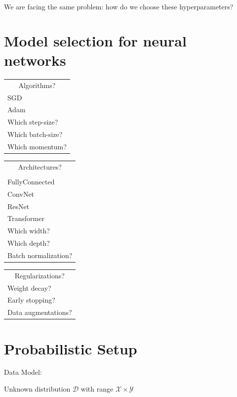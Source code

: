 \documentclass[10pt]{article}
\begin{document}
We are facing the same problem: how do we choose these hyperparameters?

\section*{Model selection for neural networks}
\begin{center}
\begin{tabular}{|l|}
\hline
\multicolumn{1}{|c|}{Algorithms?} \\
SGD \\
Adam \\
Which step-size? \\
Which batch-size? \\
Which momentum? \\
\hline
\end{tabular}
\end{center}

\begin{center}
\begin{tabular}{|l|}
\hline
\multicolumn{1}{|c|}{Architectures?} \\
 \\
FullyConnected \\
ConvNet \\
ResNet \\
Transformer \\
Which width? \\
Which depth? \\
Batch normalization? \\
\hline
\end{tabular}
\end{center}

\begin{center}
\begin{tabular}{|l|}
\hline
\multicolumn{1}{|c|}{Regularizations?} \\
Weight decay? \\
Early stopping? \\
Data augmentations? \\
\hline
\end{tabular}
\end{center}

\section*{Probabilistic Setup}
Data Model:

Unknown distribution $\mathscr{D}$ with range $\mathscr{X} \times \mathscr{Y}$
\end{document}
